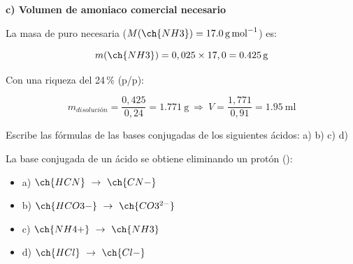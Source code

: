 \begin{exerciseEVAU}
\begin{solu}
        \textbf{c) Volumen de amoniaco comercial necesario}

        La masa de  puro necesaria (\(M(\ch{NH3}) = \SI{17.0}{\gram\per\mole}\)) es:

        \begin{equation*}
            m(\ch{NH3}) = 0,025\times17,0 = \SI{0.425}{\gram}
        \end{equation*}

        Con una riqueza del 24\,\% (p/p):

        \begin{equation*}
            m_{disolución} = \dfrac{0,425}{0,24} = \SI{1.771}{\gram} \ \Rightarrow \ V = \dfrac{1,771}{0,91} = \SI{1.95}{\milli\litre}
        \end{equation*}

    \end{solu}
\end{exerciseEVAU}

\begin{exerciseEVAU}
    Escribe las fórmulas de las bases conjugadas de los siguientes ácidos: a)  b)  c)  d) 


    \begin{solu}


        La base conjugada de un ácido se obtiene eliminando un protón ():

        \begin{itemize}
            \item a) \(\ch{HCN} \ \rightarrow \ \ch{CN-}\)
            \item b) \(\ch{HCO3-} \ \rightarrow \ \ch{CO3^{2-}}\)
            \item c) \(\ch{NH4+} \ \rightarrow \ \ch{NH3}\)
            \item d) \(\ch{HCl} \ \rightarrow \ \ch{Cl-}\)
        \end{itemize}

    \end{solu}
\end{exerciseEVAU}

